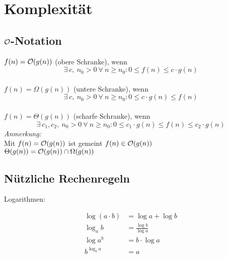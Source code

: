 %
%

\chapter{Komplexität}
    \section{$\mathcal{O}$-Notation}
    $f(n) = \mathcal{O}(g(n))$ (obere Schranke), wenn 
    $$
        \exists \ c ,\ n_0 > 0 \ \forall \ n \geq n_0: 0 \leq f(n) \leq c \cdot g(n)
    $$\\
    $f(n) = \Omega(g(n))$ (untere Schranke), wenn
    $$
    		\exists \ c ,\ n_0 > 0 \ \forall \ n \geq n_0: 0\leq c\cdot g(n)\leq f(n)
    $$\\
    $f(n) = \Theta(g(n))$ (scharfe Schranke), wenn
    $$
    		\exists \ c_1,c_2 ,\ n_0 > 0 \ \forall \ n \geq n_0: 0\leq c_1\cdot g(n)\leq f(n)\leq c_2\cdot g(n)
    $$
    \textit{Anmerkung:} \\
 	 Mit $f(n) = \mathcal{O}(g(n))$ ist gemeint $f(n) \in \mathcal{O}(g(n))$ \\
     $\Theta(g(n))=\mathcal{O}(g(n))\cap \Omega(g(n))$
    
    \section{Nützliche Rechenregeln}
        Logarithmen:
        
        \begin{align*}
            \log(a \cdot b) &= \log a + \log b \\
            \log_a b &= \frac{\log b}{\log a} \\
            \log a^b &= b \cdot \log a \\
            b^{\log_b a} &= a 
        \end{align*}

